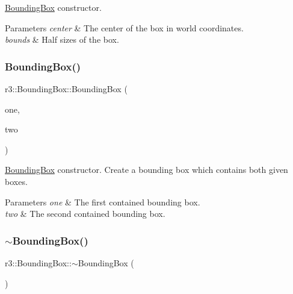 \mbox{\hyperlink{classr3_1_1_bounding_box}{Bounding\+Box}} constructor. 


\begin{DoxyParams}{Parameters}
{\em center} & The center of the box in world coordinates. \\
\hline
{\em bounds} & Half sizes of the box. \\
\hline
\end{DoxyParams}
\mbox{\label{classr3_1_1_bounding_box_a23750f8e74b918e0b39ce2c2fe609574}} 
\subsubsection{\texorpdfstring{Bounding\+Box()}{BoundingBox()}\hspace{0.1cm}{\footnotesize\ttfamily [3/3]}}
{\footnotesize\ttfamily r3\+::\+Bounding\+Box\+::\+Bounding\+Box (\begin{DoxyParamCaption}\item[{const \mbox{\hyperlink{classr3_1_1_bounding_box}{Bounding\+Box}} \&}]{one,  }\item[{const \mbox{\hyperlink{classr3_1_1_bounding_box}{Bounding\+Box}} \&}]{two }\end{DoxyParamCaption})}



\mbox{\hyperlink{classr3_1_1_bounding_box}{Bounding\+Box}} constructor. Create a bounding box which contains both given boxes. 


\begin{DoxyParams}{Parameters}
{\em one} & The first contained bounding box. \\
\hline
{\em two} & The second contained bounding box. \\
\hline
\end{DoxyParams}
\mbox{\label{classr3_1_1_bounding_box_a9257cfab936d3331cba765cb19527aa1}} 
\subsubsection{\texorpdfstring{$\sim$\+Bounding\+Box()}{~BoundingBox()}}
{\footnotesize\ttfamily r3\+::\+Bounding\+Box\+::$\sim$\+Bounding\+Box (\begin{DoxyParamCaption}{ }\end{DoxyParamCaption})\hspace{0.3cm}{\ttfamily [default]}}



